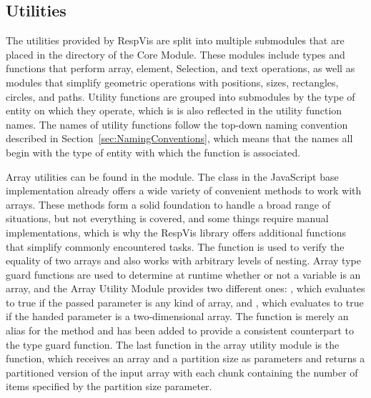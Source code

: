 \subsection{Utilities}

The utilities provided by RespVis are split into multiple submodules
that are placed in the  directory of the Core Module.
These modules include types and functions that perform array, element,
Selection, and text operations, as well as modules that simplify
geometric operations with positions, sizes, rectangles, circles, and
paths.  Utility functions are grouped into submodules by the type of
entity on which they operate, which is is also reflected in the
utility function names.  The names of utility functions follow the
top-down naming convention described in
Section~\ref{sec:NamingConventions}, which means that the names all
begin with the type of entity with which the function is associated.

Array utilities can be found in the  module.
The  class in the JavaScript base implementation already
offers a wide variety of convenient methods to work with arrays.
These methods form a solid foundation to handle a broad range of
situations, but not everything is covered, and some things require
manual implementations, which is why the RespVis library offers
additional functions that simplify commonly encountered tasks.  The
 function is used to verify the equality of two
arrays and also works with arbitrary levels of nesting.  Array type
guard functions are used to determine at runtime whether or not a
variable is an array, and the Array Utility Module provides two
different ones: , which evaluates to true if the passed
parameter is any kind of array, and , which evaluates
to true if the handed parameter is a two-dimensional array.  The
 function is merely an alias for the
 method and has been added to provide a consistent
counterpart to the  type guard function.  The last
function in the array utility module is the 
function, which receives an array and a partition size as parameters
and returns a partitioned version of the input array with each chunk
containing the number of items specified by the partition size
parameter.



